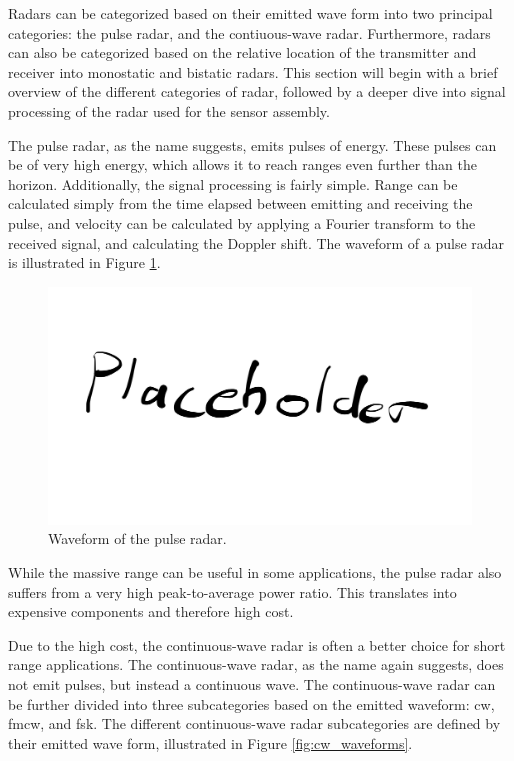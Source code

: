 Radars can be categorized based on their emitted wave form into two principal categories:
the pulse radar, and the contiuous-wave radar.
Furthermore, radars can also be categorized 
based on the relative location of the transmitter and receiver
into monostatic and bistatic radars.
This section will begin with a brief overview of the different categories of radar,
followed by a deeper dive into signal processing of the radar used for the sensor assembly.

The pulse radar, as the name suggests, emits pulses of energy.
These pulses can be of very high energy,
which allows it to reach ranges even further than the horizon. %
Additionally, the signal processing is fairly simple.
Range can be calculated simply from the time elapsed between emitting and receiving the pulse,
and velocity can be calculated by applying a Fourier transform to the received signal,
and calculating the Doppler shift.
The waveform of a pulse radar is illustrated in Figure \ref{fig:pulse_waveform}.

\begin{figure}
    \centering
    \includegraphics[width=\textwidth]{fig/placeholder.png}
    \caption{Waveform of the pulse radar.}
    \label{fig:pulse_waveform}
\end{figure}

While the massive range can be useful in some applications,
the pulse radar also suffers from a very high peak-to-average power ratio.
This translates into expensive components and therefore high cost.

Due to the high cost,
the continuous-wave radar is often a better choice for short range applications.
The continuous-wave radar, as the name again suggests,
does not emit pulses, but instead a continuous wave.
The continuous-wave radar can be further divided into three subcategories 
based on the emitted waveform:
\gls{cw}, \gls{fmcw}, and \gls{fsk}.
The different continuous-wave radar subcategories are defined by their emitted wave form,
illustrated in Figure \ref{fig:cw_waveforms}.

